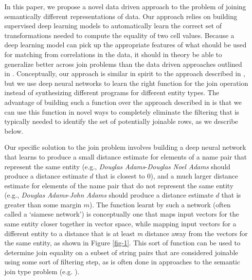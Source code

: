 In this paper, we propose a novel data driven approach to the problem of joining semantically different representations of data.  Our approach relies on building supervised deep learning models to automatically learn the correct set of transformations needed to compute the equality of two cell values.  Because a deep learning model can pick up the appropriate features of what should be used for matching from correlations in the data, it should in theory be able to generalize better across join problems than the data driven approaches outlined in \cite{He:2015:SJS:2824032.2824036}.   Conceptually, our approach is similar in spirit to the approach described in \cite{auto-join-joining-tables-leveraging-transformations}, but we use deep neural networks to learn the right function for the join operation instead of synthesizing different programs for different entity types.  The advantage of building such a function over the approach described in \cite{auto-join-joining-tables-leveraging-transformations} is that we can use this function in novel ways to completely eliminate the filtering that is typically needed to identify the set of potentially joinable rows, as we describe below.  

Our specific solution to the join problem involves building a deep neural network that learns to produce a small distance estimate for elements of a name pair that represent the same entity (e.g., \textit{Douglas Adams}-\textit{Douglas Noel Adams} should produce a distance estimate $d$ that is closest to 0), and a much larger distance estimate for elements of the name pair that do not represent the same entity (e.g., \textit{Douglas Adams}-\textit{John Adams} should produce a distance estimate $d$ that is greater than some margin $m$).  The function learnt by such a network (often called a `siamese network') is conceptually one that maps input vectors for the same entity closer together in vector space, while mapping input vectors for a different entity to a distance that is at least \textit{m} distance away from the vectors for the same entity, as shown in Figure \ref{fig-1}.  This sort of function can be used to determine join equality on a subset of string pairs that are considered joinable using some sort of filtering step, as is often done in approaches to the semantic join type problem (e.g. \cite{auto-join-joining-tables-leveraging-transformations}).  

